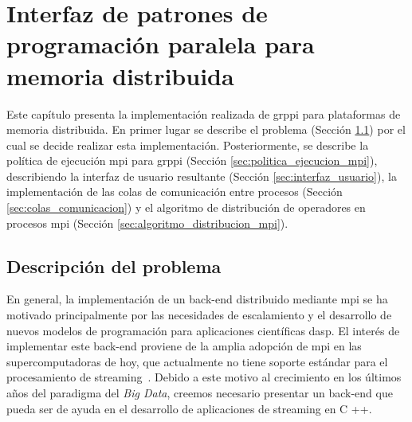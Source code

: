 \chead[]{}
\renewcommand{\headrulewidth}{0.5pt}

\lfoot[]{}
\cfoot[]{}
\rfoot[]{}
\renewcommand{\footrulewidth}{0pt}

\chapter{Interfaz de patrones de programación paralela para memoria distribuida}
\label{ch:interfaz_patrones_memoria_distribuida}

Este capítulo presenta la implementación realizada de \acrshort{grppi} para plataformas de memoria distribuida. En primer lugar se describe el problema (Sección \ref{sec:descripcion_problema}) por el cual se decide realizar esta implementación. Posteriormente, se describe la política de ejecución \acrshort{mpi} para \acrshort{grppi} (Sección \ref{sec:politica_ejecucion_mpi}), describiendo la interfaz de usuario resultante (Sección \ref{sec:interfaz_usuario}), la implementación de las colas de comunicación entre procesos (Sección \ref{sec:colas_comunicacion}) y el algoritmo de distribución de operadores en procesos \acrshort{mpi} (Sección \ref{sec:algoritmo_distribucion_mpi}).

\section{Descripción del problema}
\label{sec:descripcion_problema}

En general, la implementación de un back-end distribuido mediante \acrshort{mpi} se ha motivado principalmente por las necesidades de escalamiento y el desarrollo de nuevos modelos de programación para aplicaciones científicas \acrshort{dasp}. El interés de implementar este back-end proviene de la amplia adopción de \acrshort{mpi} en las supercomputadoras de hoy, que actualmente no tiene soporte estándar para el procesamiento de streaming~\cite{peng2017}. Debido a este motivo al crecimiento en los últimos años del paradigma del \emph{Big Data}, creemos necesario presentar un back-end que pueda ser de ayuda en el desarrollo de aplicaciones de streaming en C ++.

